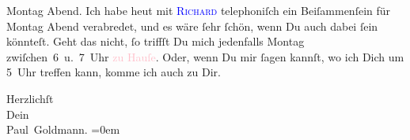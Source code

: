                   Montag{ }Abend. Ich habe heut mit \textsc{\textcolor{blue}{Richard}{}\ledrightnote{\textcolor{blue}{Richard Beer-Hofmann}}} telephoniſch ein Beiſammenſein für Montag{ }Abend verabredet, und es wäre ſehr ſchön, wenn Du auch dabei ſein
               könnteſt. Geht das nicht, ſo triffſt Du mich jedenfalls Montag{ }zwiſchen 6 u. 7 Uhr{ }\textcolor{pink}{zu Hauſe}{}\ledrightnote{{$\rightarrow$}\textcolor{pink}{Dessauer Straße}}. Oder, wenn Du mir
               ſagen kannſt, wo ich Dich um 5 Uhr treffen kann, komme ich auch zu
               Dir.\pend
           
\pstart
           Herzlichſt {\\[\baselineskip]}Dein {\\[\baselineskip]}\spacefill\mbox{Paul Goldmann.}\pend
           \leftskip=0em{}\endnumbering{}  
      